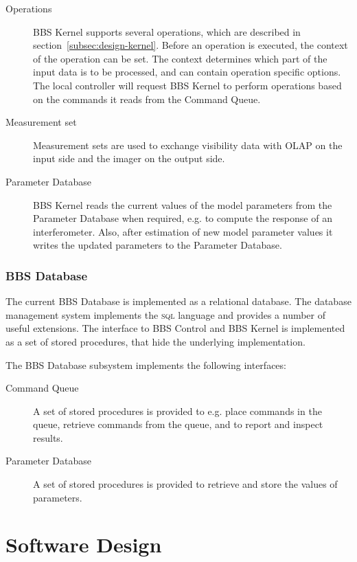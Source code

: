 \documentclass[10pt]{lofar}
\begin{document}
\begin{description}
\item [Operations]
BBS Kernel supports several operations, which are described in
section~\ref{subsec:design-kernel}. Before an operation is executed, the context
of the operation can be set. The context determines which part of the input data
is to be processed, and can contain operation specific options. The local
controller will request BBS Kernel to perform operations based on the commands
it reads from the Command Queue.
\item [Measurement set]
Measurement sets are used to exchange visibility data with OLAP on the input
side and the imager on the output side.
\item [Parameter Database]
BBS Kernel reads the current values of the model parameters from the Parameter
Database when required, e.g. to compute the response of an interferometer. Also,
after estimation of new model parameter values it writes the updated parameters
to the Parameter Database.
\end{description}

\subsubsection{BBS Database}
\label{subsubsec:interf-database}

The current BBS Database is implemented as a relational database. The database
management system implements the \textsc{sql} language and provides a number of
useful extensions. The interface to BBS Control and BBS Kernel is implemented as
a set of stored procedures, that hide the underlying implementation.

The BBS Database subsystem implements the following interfaces:
\begin{description}
\item [Command Queue]
A set of stored procedures is provided to e.g. place commands in the queue,
retrieve commands from the queue, and to report and inspect results.
\item [Parameter Database]
A set of stored procedures is provided to retrieve and store the values of
parameters.
\end{description}

\cleardoublepage

\section{Software Design}
\label{sec:software-design}
\end{document}
